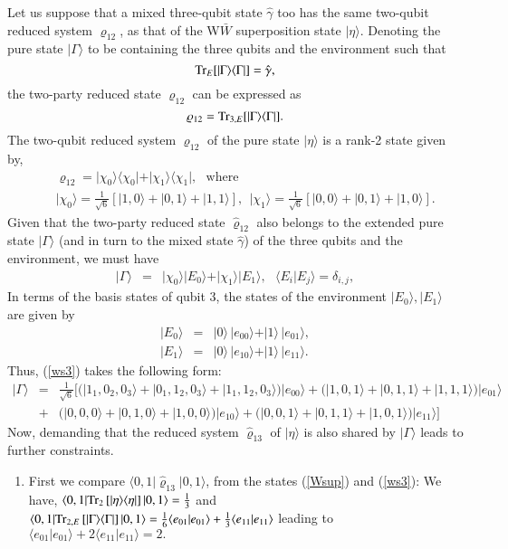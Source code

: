 {Let us suppose that a mixed  three-qubit state $\hat\gamma$ too has the same two-qubit reduced system $\varrho_{12}$, 
as that of the W$\bar W$ superposition state $\vert \eta\rangle.$ Denoting the pure state $\vert \Gamma\rangle$ to be  
containing the three qubits and the environment such that  
\[ 
{\rm Tr}_{E}[\vert\Gamma\rangle\langle \Gamma\vert]=\hat\gamma,
\] 
the two-party reduced state $\varrho_{12}$ can be expressed as  
$$\varrho_{12}={\rm Tr}_{3, E}[\vert \Gamma\rangle\langle \Gamma\vert].$$ 
The two-qubit reduced system $\varrho_{12}$ of the pure  
state $\vert\eta\rangle$ is a rank-2 state given by,  
\begin{eqnarray}
\label{ws2}
& &\varrho_{12}=\vert \chi_0\rangle\langle \chi_0\vert + 
\vert \chi_1\rangle\langle \chi_1\vert, \ \ \ \mbox{where} \\ 
& &\vert \chi_0\rangle=\frac{1}{\sqrt{6}}[|1,0\rangle+|0,1\rangle+|1,1\rangle], \ \ 
   \vert \chi_1\rangle=\frac{1}{\sqrt{6}}[|0,0\rangle+|0,1\rangle+|1,0\rangle].  \nonumber
\end{eqnarray}
Given that the two-party reduced state $\hat{\varrho}_{12}$ also belongs to the extended pure state 
$\vert\Gamma\rangle$ (and in turn to the mixed state $\hat\gamma$) of the three qubits and the environment, we must have  
\begin{eqnarray}
\label{ws3}
\vert\Gamma\rangle&=&\vert \chi_0\rangle\vert E_0\rangle +\vert \chi_1\rangle\vert E_1\rangle, \ \ \ \langle E_i\vert E_j\rangle=\delta_{i,j},
 \end{eqnarray}     
In terms of the basis states of qubit 3, the states of the environment 
$\vert E_{0}\rangle, \vert E_{1}\rangle$ are given by
\begin{eqnarray}
\vert E_0\rangle&=&\vert 0\rangle\,  \vert e_{00}\rangle+\vert 1\rangle\,  \vert e_{01}\rangle, \nonumber\\ 
\vert E_1\rangle&=&\vert 0\rangle\,  \vert e_{10}\rangle+\vert 1\rangle\,  \vert e_{11}\rangle.
\end{eqnarray}   
Thus,   (\ref{ws3}) takes the following  form: 
\begin{eqnarray} 
\label{Gamma}
|\Gamma\rangle&=&\frac{1}{\sqrt{6}}[(|1_1,0_2,0_3\rangle+|0_1,1_2,0_3\rangle+|1_1,1_2,0_3\rangle)|e_{00}\rangle 
+(|1,0,1\rangle+|0,1,1\rangle+|1,1,1\rangle)|e_{01}\rangle \nonumber \\
&+& (|0,0,0\rangle+|0,1,0\rangle+|1,0,0\rangle)|e_{10}\rangle
+(|0,0,1\rangle +|0,1,1\rangle+|1,0,1\rangle)|e_{11}\rangle] 
\end{eqnarray}
Now, demanding that the reduced system $\hat{\varrho}_{13}$ of $\vert \eta\rangle$ is also shared by  $\vert 
\Gamma\rangle$ leads to further constraints.  
\begin{enumerate}
\item First we compare  $\langle 0,1\vert \hat{\varrho}_{13}\vert 0,1\rangle$,  from the states 
(\ref{Wsup}) and (\ref{ws3}): We have,  
$\langle 0,1|{\rm Tr}_{2}\,[\vert\eta\rangle \langle\eta\vert]\, |0,1\rangle= 
\frac{1}{3}$ and \break 
$\langle 0,1|{\rm Tr}_{2,E}\,[\vert\Gamma\rangle \langle\Gamma\vert]\, |0,1\rangle= 
\frac{1}{6}\langle e_{01}|e_{01}\rangle+\frac{1}{3}\langle e_{11}|e_{11}\rangle$ 
leading to  
$\langle e_{01}|e_{01}\rangle+2\langle e_{11}|e_{11}\rangle=2.$ 
 


\end{enumerate}}

